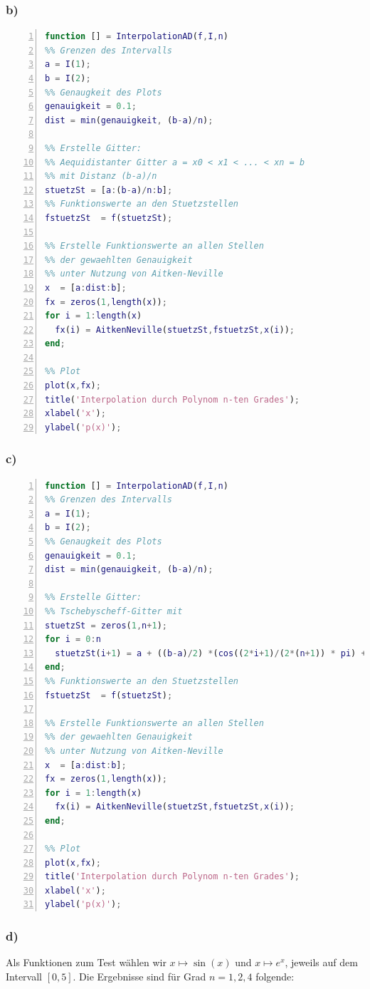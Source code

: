 \documentclass[11pt,a4paper,ngerman]{article}
\begin{document}
\subsubsection*{b)}
\begin{lstlisting}[language=matlab,numbers=left]
function [] = InterpolationAD(f,I,n)
%% Grenzen des Intervalls
a = I(1);
b = I(2);
%% Genaugkeit des Plots
genauigkeit = 0.1;
dist = min(genauigkeit, (b-a)/n);

%% Erstelle Gitter:
%% Aequidistanter Gitter a = x0 < x1 < ... < xn = b
%% mit Distanz (b-a)/n
stuetzSt = [a:(b-a)/n:b];
%% Funktionswerte an den Stuetzstellen
fstuetzSt  = f(stuetzSt);

%% Erstelle Funktionswerte an allen Stellen
%% der gewaehlten Genauigkeit
%% unter Nutzung von Aitken-Neville
x  = [a:dist:b];
fx = zeros(1,length(x));
for i = 1:length(x)
  fx(i) = AitkenNeville(stuetzSt,fstuetzSt,x(i));
end;

%% Plot
plot(x,fx);
title('Interpolation durch Polynom n-ten Grades');
xlabel('x');
ylabel('p(x)');
\end{lstlisting}
\subsubsection*{c)}
\begin{lstlisting}[language=matlab,numbers=left]
function [] = InterpolationAD(f,I,n)
%% Grenzen des Intervalls
a = I(1);
b = I(2);
%% Genaugkeit des Plots
genauigkeit = 0.1;
dist = min(genauigkeit, (b-a)/n);

%% Erstelle Gitter:
%% Tschebyscheff-Gitter mit 
stuetzSt = zeros(1,n+1);
for i = 0:n
  stuetzSt(i+1) = a + ((b-a)/2) *(cos((2*i+1)/(2*(n+1)) * pi) + 1);
end;
%% Funktionswerte an den Stuetzstellen
fstuetzSt  = f(stuetzSt);

%% Erstelle Funktionswerte an allen Stellen
%% der gewaehlten Genauigkeit
%% unter Nutzung von Aitken-Neville
x  = [a:dist:b];
fx = zeros(1,length(x));
for i = 1:length(x)
  fx(i) = AitkenNeville(stuetzSt,fstuetzSt,x(i));
end;

%% Plot
plot(x,fx);
title('Interpolation durch Polynom n-ten Grades');
xlabel('x');
ylabel('p(x)');
\end{lstlisting}

\newpage
\subsubsection*{d)}
Als Funktionen zum Test wählen wir $x \mapsto \sin(x)$ und $x \mapsto e^x$, jeweils auf dem Intervall $[0,5]$.
Die Ergebnisse sind für Grad $n = 1,2,4$ folgende:  \\
\end{document}
